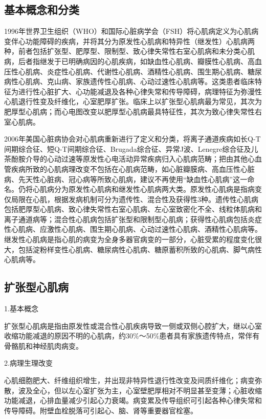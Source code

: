 \protect\hypertarget{text00051.htmlux5cux23subid614}{}{}

\subsection{基本概念和分类}

1996年世界卫生组织（WHO）和国际心脏病学会（FSH）将心肌病定义为心肌病变伴心功能障碍的疾病，并将其分为原发性心肌病和特异性（继发性）心肌病两种，前者包括扩张型、肥厚型、限制型、致心律失常性右室心肌病和未分类心肌病，后者指继发于已明确病因的心肌疾病，如缺血性心肌病、瓣膜性心肌病、高血压性心肌病、炎症性心肌病、代谢性心肌病、酒精性心肌病、围生期心肌病、糖尿病性心肌病、克山病、家族遗传性心肌病、心动过速性心肌病等。这类患者临床特征为进行性心脏扩大、心功能减退及各种心律失常和传导障碍，病理特征为弥漫性心肌退行性变及纤维化，心室肥厚扩张。临床上以扩张型心肌病最为常见，其次为肥厚型心肌病；而心电图改变以肥厚型心肌病最具特征性，其次为致心律失常性右室心肌病。

2006年美国心脏病协会对心肌病重新进行了定义和分类，将离子通道疾病如长Q-T间期综合征、短Q-T间期综合征、Brugada综合征、异常J波、Lenegre综合征及儿茶酚胺介导的心动过速等原发性心电活动异常疾病归入心肌病范畴；把由其他心血管疾病所致的心肌病理改变不包括在心肌病范畴，如心脏瓣膜病、高血压性心脏病、先天性心脏病、冠心病等所致心肌病，建议不再使用“缺血性心肌病”这一命名。仍将心肌病分为原发性心肌病和继发性心肌病两大类。原发性心肌病是指病变仅局限在心肌，根据发病机制可分为遗传性、混合性及获得性3种。遗传性心肌病包括肥厚型心肌病、致心律失常性右室心肌病、左心室致密化不全、线粒体肌病和离子通道病等；混合性心肌病包括扩张型和限制型心肌病；获得性心肌病包括炎症性心肌病、应激性心肌病、围生期心肌病、心动过速性心肌病、酒精性心肌病等。继发性心肌病是指心肌的病变为全身多器官病变的一部分，心脏受累的程度变化很大，包括淀粉样变性心肌病、糖尿病性心肌病、糖原蓄积所致的心肌病、脚气病性心肌病等。

\protect\hypertarget{text00051.htmlux5cux23subid615}{}{}

\subsection{扩张型心肌病}

1.基本概念

扩张型心肌病是指由原发性或混合性心肌疾病导致一侧或双侧心腔扩大，继以心室收缩功能减退的原因不明的心肌病，约30\%～50\%患者具有家族遗传特点，常伴有骨骼肌和神经肌肉病变。

2.病理生理改变

心肌细胞肥大、纤维组织增生，并出现非特异性退行性改变及间质纤维化；病变弥散，波及全心，但以左心室扩张为主，心室壁肥厚相对不明显甚至变薄；心脏收缩功能减退，心排血量减少引起心力衰竭。病变累及传导组织可引起各种心律失常和传导障碍。附壁血栓脱落可引起心、脑、肾等重要器官栓塞。

